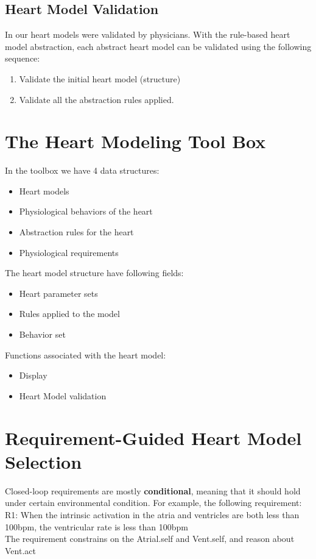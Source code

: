 \documentclass{llncs}
\begin{document}
\subsection{Heart Model Validation}
In \cite{VHM_proc} our heart models were validated by physicians. With the rule-based heart model abstraction, each abstract heart model can be validated using the following sequence:
\begin{enumerate}
	\item Validate the initial heart model (structure)
    \item Validate all the abstraction rules applied.
\end{enumerate}

\section{The Heart Modeling Tool Box}
In the toolbox we have 4 data structures: 
\begin{itemize}
	\item Heart models
    \item Physiological behaviors of the heart
    \item Abstraction rules for the heart
    \item Physiological requirements
\end{itemize}
The heart model structure have following fields:
\begin{itemize}
	\item Heart parameter sets
    \item Rules applied to the model
    \item Behavior set
\end{itemize}
Functions associated with the heart model:
\begin{itemize}
    \item Display
    \item Heart Model validation
\end{itemize}

\section{Requirement-Guided Heart Model Selection}
Closed-loop requirements are mostly \textbf{conditional}, meaning that it should hold under certain environmental condition. For example, the following requirement:\\
\textsf{R1: When the intrinsic activation in the atria and ventricles are both less than 100bpm, the ventricular rate is less than 100bpm}\\
The requirement constrains on the \textsf{Atrial.self} and \textsf{Vent.self}, and reason about \textsf{Vent.act}
\end{document}
